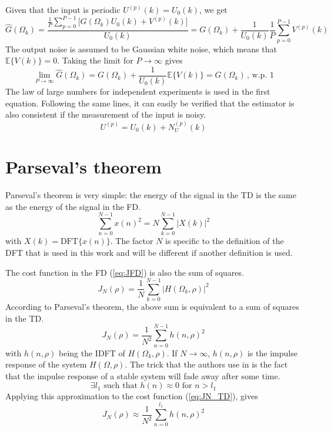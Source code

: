 Given that the input is periodic $U^{(p)}(k) = U_0(k)$, we get
\begin{equation*}
    \hat G(\Omega_k) = \frac{\frac{1}{P}\sum_{p=0}^{P-1} \Big [ G(\Omega_k) U_0(k) + V^{(p)}(k) \Big ]}{U_0(k)} = G(\Omega_k) + \frac{1}{U_0(k)} \frac{1}{P}\sum_{p=0}^{P-1} V^{(p)}(k)
\end{equation*}
The output noise is assumed to be Gaussian white noise, which means that $\mathbb{E}\{V(k)\}=0$. Taking the limit for $P \rightarrow \infty$ gives
\begin{equation*}
    \lim_{P \rightarrow \infty} \hat G(\Omega_k) = G(\Omega_k) + \frac{1}{U_0(k)} \mathbb{E}\{V(k)\} = G(\Omega_k) \,,\, \text{w.p. } 1
\end{equation*}
The law of large numbers for independent experiments is used in the first equation. Following the same lines, it can easily be verified that the estimator is also consistent if the measurement of the input is noisy.
\begin{equation*}
    U^{(p)} = U_0(k) + N_U^{(p)}(k)
\end{equation*}

\newpage
\section{Parseval's theorem}
\label{sec:parseval}
Parseval's theorem is very simple: the energy of the signal in the TD is the same as the energy of the signal in the FD.
\begin{equation}
    \sum_{n=0}^{N-1} x(n)^2 = N \sum_{k=0}^{N-1} |X(k)|^2
    \label{eq:parseval_theorem}
\end{equation}
with $X(k) = \text{DFT}\{x(n)\}$. The factor $N$ is specific to the definition of the DFT that is used in this work and will be different if another definition is used.

The cost function in the FD (\ref{eq:JFD}) is also the sum of squares.
\begin{equation*}
    J_N(\rho) = \frac{1}{N} \sum_{k=0}^{N-1} |H(\Omega_k,\rho)|^2
\end{equation*}
According to Parseval's theorem, the above sum is equivalent to a sum of squares in the TD.
\begin{equation}
    J_N(\rho) = \frac{1}{N^2}\sum_{n=0}^{N-1} h(n,\rho)^2
    \label{eq:JN_TD}
\end{equation}
with $h(n,\rho)$ being the IDFT of $H(\Omega_k,\rho)$. If $N \rightarrow \infty$, $h(n,\rho)$ is the impulse response of the system $H(\Omega,\rho)$. The trick that the authors use in \cite{Data-driven_model_reference_control} is the fact that the impulse response of a stable system will fade away after some time.
\begin{equation*}
    \exists l_1 \text{ such that } h(n) \approx 0 \text{ for } n > l_1
\end{equation*}
Applying this approximation to the cost function (\ref{eq:JN_TD}), gives
\begin{equation}
    J_N(\rho) \approx  \frac{1}{N^2} \sum_{n=0}^{l_1} h(n,\rho)^2
    \label{eq:Japprox_impulse_response}
\end{equation}


